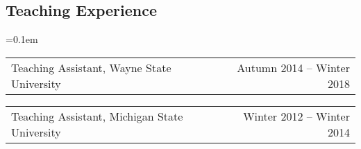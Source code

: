 \documentclass[10pt,letterpaper]{article}
\makeatletter
\newcommand{\headerrow}[2]
{\begin{tabular*}{\linewidth}{l@{\extracolsep{\fill}}r}
	#1 &
	#2 \\
\end{tabular*}}
\makeatother
\begin{document}
\subsection*{Teaching Experience}

\begin{itemize*}
	\parskip=0.1em
	\begin{comment}
	\item[]
	\headerrow
		{Teaching Assistant, General Physics I, Wayne State University}
		{Winter 2018}
	\item[]
	\headerrow
		{Teaching Assistant, General Physics II, Wayne State University}
		{Autumn 2017}
	\item[]
	\headerrow
		{Teaching Assistant, General Physics II, Wayne State University}
		{Winter 2017}
	\item[]
	\headerrow
		{Teaching Assistant, General Physics II, Wayne State University}
		{Autumn 2016}
	\item[]
	\headerrow
		{Teaching Assistant, General Physics I, Wayne State University}
		{Summer 2016}
	\item[]
	\headerrow
		{Teaching Assistant, General Physics I, Wayne State University}
		{Autumn 2015}	
	\item[]
	\headerrow
		{Teaching Assistant, General Physics Lab I, Wayne State University}
		{Summer 2015}
	\item[]
	\headerrow
		{Laboratory Instructor, Conceptual Physics Lab I, Wayne State University}
		{Winter 2015}
	\item[]
	\headerrow
		{Laboratory Instructor, Descriptive Astronomy Lab I, Wayne State University}
		{Autumn 2014}
	\item[]
	\headerrow
		{Teaching Assistant, Introductory Physics II, Michigan State University}
		{Winter 2014}
	\item[]
	\headerrow
		{Laboratory Instructor, Planets and Telescopes, Michigan State University}
		{Winter 2013}
	\item[]
	\headerrow
		{Teaching Assistant, Introductory Physics I, Michigan State University}
		{Autumn 2013}
	\item[]
	\headerrow
		{Teaching Assistant, Introductory Physics II, Michigan State University}
		{Winter 2012}
	\end{comment}

	\item[]
	\headerrow
		{Teaching Assistant, Wayne State University}
		{Autumn 2014 -- Winter 2018}
	\item[]
	\headerrow
		{Teaching Assistant, Michigan State University}
		{Winter 2012 -- Winter 2014}

\end{itemize*}
\end{document}
